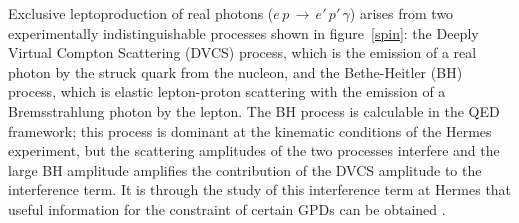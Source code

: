 Exclusive leptoproduction of real photons
($e\,p\,\rightarrow\,e'\,p'\,\gamma$) arises from
two experimentally indistinguishable processes shown in
figure~\ref{spin}: the Deeply Virtual Compton Scattering (DVCS) process,
which is the emission of a real photon by the struck quark from the nucleon, and the Bethe-Heitler (BH) process, which is elastic lepton-proton scattering with the
emission of a Bremsstrahlung photon by the lepton. 
The BH process is calculable in the QED framework; this process is
dominant at the kinematic conditions of the H{\sc ermes} experiment, but the
scattering amplitudes of the two processes interfere and the large BH amplitude
amplifies the contribution of the DVCS amplitude to the interference term. 
It is through the study of this interference term at H{\sc ermes} that
useful information for the constraint of certain GPDs can be obtained \cite{Bel02b}.

